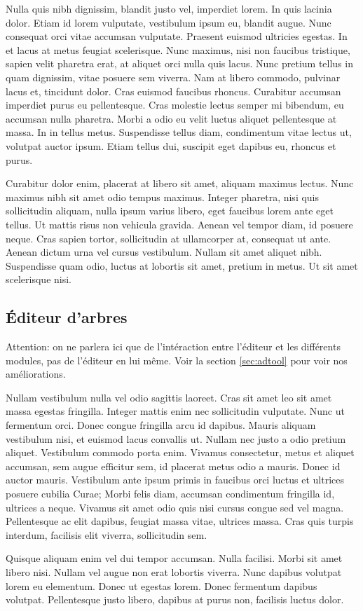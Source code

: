 		Nulla quis nibh dignissim, blandit justo vel, imperdiet lorem. In quis lacinia dolor. Etiam id lorem vulputate, vestibulum ipsum eu, blandit augue. Nunc consequat orci vitae accumsan vulputate. Praesent euismod ultricies egestas. In et lacus at metus feugiat scelerisque. Nunc maximus, nisi non faucibus tristique, sapien velit pharetra erat, at aliquet orci nulla quis lacus. Nunc pretium tellus in quam dignissim, vitae posuere sem viverra. Nam at libero commodo, pulvinar lacus et, tincidunt dolor. Cras euismod faucibus rhoncus. Curabitur accumsan imperdiet purus eu pellentesque. Cras molestie lectus semper mi bibendum, eu accumsan nulla pharetra. Morbi a odio eu velit luctus aliquet pellentesque at massa. In in tellus metus. Suspendisse tellus diam, condimentum vitae lectus ut, volutpat auctor ipsum. Etiam tellus dui, suscipit eget dapibus eu, rhoncus et purus.

		Curabitur dolor enim, placerat at libero sit amet, aliquam maximus lectus. Nunc maximus nibh sit amet odio tempus maximus. Integer pharetra, nisi quis sollicitudin aliquam, nulla ipsum varius libero, eget faucibus lorem ante eget tellus. Ut mattis risus non vehicula gravida. Aenean vel tempor diam, id posuere neque. Cras sapien tortor, sollicitudin at ullamcorper at, consequat ut ante. Aenean dictum urna vel cursus vestibulum. Nullam sit amet aliquet nibh. Suspendisse quam odio, luctus at lobortis sit amet, pretium in metus. Ut sit amet scelerisque nisi. 

	\subsection{\'Editeur d'arbres}
		Attention: on ne parlera ici que de l'intéraction entre l'éditeur et les différents modules, pas de l'éditeur en lui même.
		Voir la section \ref{sec:adtool} pour voir nos améliorations.

		Nullam vestibulum nulla vel odio sagittis laoreet. Cras sit amet leo sit amet massa egestas fringilla. Integer mattis enim nec sollicitudin vulputate. Nunc ut fermentum orci. Donec congue fringilla arcu id dapibus. Mauris aliquam vestibulum nisi, et euismod lacus convallis ut. Nullam nec justo a odio pretium aliquet. Vestibulum commodo porta enim. Vivamus consectetur, metus et aliquet accumsan, sem augue efficitur sem, id placerat metus odio a mauris. Donec id auctor mauris. Vestibulum ante ipsum primis in faucibus orci luctus et ultrices posuere cubilia Curae; Morbi felis diam, accumsan condimentum fringilla id, ultrices a neque. Vivamus sit amet odio quis nisi cursus congue sed vel magna. Pellentesque ac elit dapibus, feugiat massa vitae, ultrices massa. Cras quis turpis interdum, facilisis elit viverra, sollicitudin sem.

		Quisque aliquam enim vel dui tempor accumsan. Nulla facilisi. Morbi sit amet libero nisi. Nullam vel augue non erat lobortis viverra. Nunc dapibus volutpat lorem eu elementum. Donec ut egestas lorem. Donec fermentum dapibus volutpat. Pellentesque justo libero, dapibus at purus non, facilisis luctus dolor. 